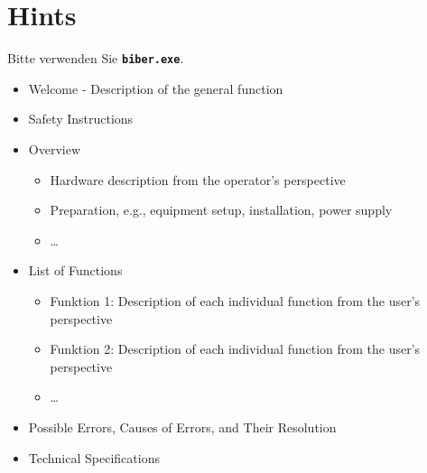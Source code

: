 %
%
%



\chapter{Hints}

Bitte verwenden Sie  \textbf{\texttt{biber.exe}}.



\bigskip

\begin{itemize}
  \item Welcome - Description of the general function
  \item Safety Instructions
  \item Overview
    \begin{itemize}
      \item Hardware description from the operator's perspective
      \item Preparation, e.g., equipment setup, installation, power supply
      \item \ldots
    \end{itemize}
  \item List of Functions
    \begin{itemize}
    	\item Funktion 1: Description of each individual function from the user's perspective
    	\item Funktion 2: Description of each individual function from the user's perspective
    	\item \ldots
    \end{itemize}
  \item Possible Errors, Causes of Errors, and Their Resolution
  \item Technical Specifications
\end{itemize}


